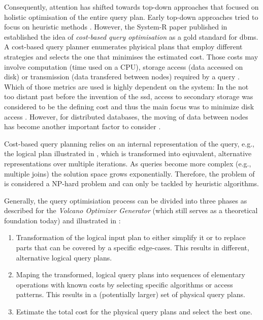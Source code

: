 Consequently, attention has shifted towards top-down approaches that focused on holistic optimisation of the entire query plan. Early top-down approaches tried to focus on heuristic methods \cite{Jarke:1984Query}. However, the System-R paper \cite{Selinger:1979Access} published in \citeyear{Selinger:1979Access} established the idea of \emph{cost-based query optimisation} as a gold standard for \acrshort{dbms}. A cost-based query planner enumerates phyisical plans that employ different strategies and selects the one that minimises the estimated cost. Those costs may involve computation (time used on a CPU), storage access (data accessed on disk) or transmission (data transfered between nodes) required by a query \cite{Jarke:1984Query,Garcia:2009Database}. Which of those metrics are used is highly dependent on the system: In the not too distant past before the invention of the \acrfull{ssd}, access to secondary storage was considered to be the defining cost and thus the main focus was to minimize disk access \cite{Garcia:2009Database}. However, for distributed databases, the moving of data between nodes has become another important factor to consider \cite{Bruno2013:Continuous}.

 Cost-based query planning relies on an internal representation of the query, e.g., the logical plan illustrated in , which is transformed into eqiuvalent, alternative representations over multiple iterations. As queries become more complex (e.g., multiple joins) the solution space grows exponentially. Therefore, the problem of is considered a NP-hard problem and can only be tackled by heuristic algorithms. 
 
 Generally, the query optimisiation process can be divided into three phases as described for the \emph{Volcano Optimizer Generator} \cite{Jarke:1984Query,Graefe:1993Volcano} (which still serves as a theoretical foundation today) and illustrated in :

\begin{enumerate}
    \item Transformation of the logical input plan to either simplify it or to replace parts that can be covered by a specific edge-cases. This results in different, alternative logical query plans.
    \item Maping the transformed, logical query plans into sequences of elementary operations with known costs by selecting specific algorithms or access patterns. This results in a (potentially larger) set of physical query plans.
    \item Estimate the total cost for the physical query plans and select the best one.
\end{enumerate}

